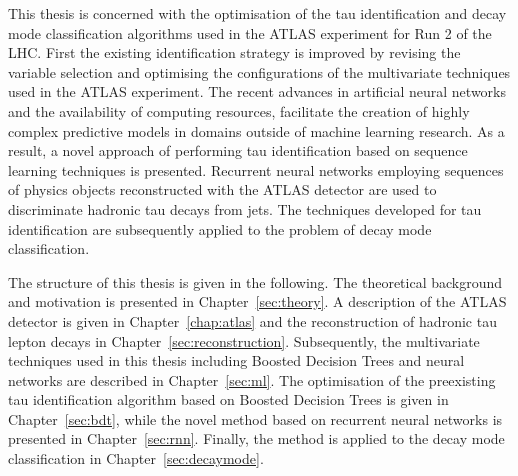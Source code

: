 This thesis is concerned with the optimisation of the tau identification and
decay mode classification algorithms used in the ATLAS experiment for Run 2 of
the LHC. First the existing identification strategy is improved by revising the
variable selection and optimising the configurations of the multivariate
techniques used in the ATLAS experiment. The recent advances in artificial
neural networks and the availability of computing resources, facilitate the
creation of highly complex predictive models in domains outside of machine
learning research. As a result, a novel approach of performing tau
identification based on sequence learning techniques is presented. Recurrent
neural networks employing sequences of physics objects reconstructed with the
ATLAS detector are used to discriminate hadronic tau decays from jets. The
techniques developed for tau identification are subsequently applied to the
problem of decay mode classification.

The structure of this thesis is given in the following. The theoretical
background and motivation is presented in Chapter~\ref{sec:theory}. A
description of the ATLAS detector is given in Chapter~\ref{chap:atlas} and the
reconstruction of hadronic tau lepton decays in
Chapter~\ref{sec:reconstruction}. Subsequently, the multivariate techniques used
in this thesis including Boosted Decision Trees and neural networks are
described in Chapter~\ref{sec:ml}. The optimisation of the preexisting tau
identification algorithm based on Boosted Decision Trees is given in
Chapter~\ref{sec:bdt}, while the novel method based on recurrent neural networks
is presented in Chapter~\ref{sec:rnn}. Finally, the method is applied to the
decay mode classification in Chapter~\ref{sec:decaymode}.



